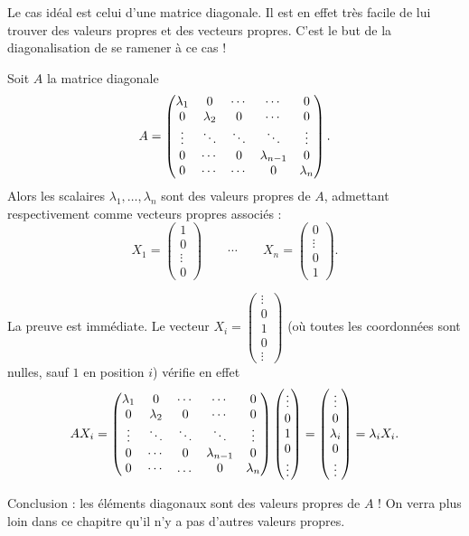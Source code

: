 \documentclass[11pt, class=report,crop=false]{standalone}
\begin{document}
Le cas idéal est celui d'une matrice diagonale. 
Il est en effet très facile de lui trouver des valeurs propres et des vecteurs propres. 
C'est le but de la \og{}diagonalisation\fg{} de se ramener à ce cas !  

\begin{exemple}
Soit $A$ la matrice diagonale 
$$A=\begin{pmatrix}
\lambda_{1}& 0& \cdots &  \cdots & 0\cr
0& \lambda_{2}& 0&  \cdots &0\cr
\vdots & \ddots & \ddots & \ddots & \vdots \cr
0& \cdots & 0 & \lambda_{n-1} & 0 \cr
0& \cdots & \cdots & 0 & \lambda_{n}\cr
\end{pmatrix}.$$
Alors les scalaires $\lambda_1, \ldots,\lambda_n$ sont des valeurs propres de $A$, admettant respectivement comme vecteurs propres associés : 
$$X_1 = \begin{pmatrix} 1 \\ 0 \\ \vdots \\ 0 \end{pmatrix} \qquad \cdots \qquad
X_n = \begin{pmatrix} 0 \\ \vdots \\ 0 \\ 1\end{pmatrix}.$$

La preuve est immédiate. Le vecteur $X_i = \left(\begin{smallmatrix}\vdots\\0\\1\\0 \\\vdots\end{smallmatrix}\right) $ (où toutes les coordonnées sont nulles, sauf $1$ en position $i$) vérifie en effet
$$AX_i = 
\begin{pmatrix}
\lambda_{1}& 0& \cdots &  \cdots & 0\cr
0& \lambda_{2}& 0&  \cdots &0\cr
\vdots & \ddots & \ddots & \ddots & \vdots \cr
0& \cdots & 0 & \lambda_{n-1} & 0 \cr
0& \cdots & \dots & 0 & \lambda_{n}\cr
\end{pmatrix} 
\begin{pmatrix}
\vdots\\0\\1\\0 \\\vdots
\end{pmatrix}
= 
 \begin{pmatrix}
\vdots\\0\\\lambda_i\\0 \\\vdots
\end{pmatrix}
= \lambda_i X_i.$$

Conclusion : les éléments diagonaux sont des valeurs propres de $A$ ! On verra plus loin dans ce chapitre qu'il n'y a pas d'autres valeurs propres.
\end{exemple} 
\end{document}
